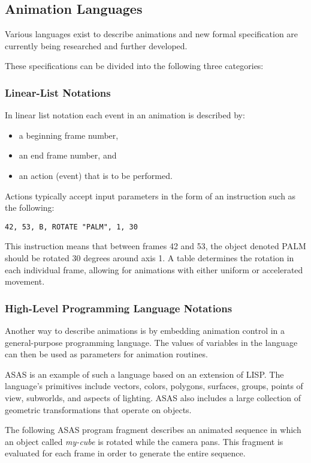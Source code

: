\subsection{Animation Languages}
Various languages exist to describe animations and new formal specification are currently being researched and further developed.

These specifications can be divided into the following three categories:

\subsubsection{Linear-List Notations}
In linear list notation each event in an animation is described by:
\begin{itemize}
	\item a beginning frame number, 
	\item an end frame number, and 
	\item an action (event) that is to be performed.
\end{itemize}

 Actions typically accept input parameters in the form of an instruction such as the following:
\begin{lstlisting}[numbers=none]
42, 53, B, ROTATE "PALM", 1, 30
\end{lstlisting}
This instruction means that between frames 42 and 53, the object denoted PALM should be rotated 30 degrees around axis 1. A table determines the rotation in each individual frame, allowing for animations with either uniform or accelerated movement.


\subsubsection{High-Level Programming Language Notations}
Another way to describe animations is by embedding animation control in a general-purpose programming language. The values of variables in the language can then be used as parameters for animation routines.

ASAS is an example of such a language based on an extension of LISP. The language’s primitives include vectors, colors, polygons, surfaces, groups, points of view, subworlds, and aspects of lighting. ASAS also includes a large collection of geometric transformations that operate on objects. 

The following ASAS program fragment describes an animated sequence in which an object called \textit{my-cube} is rotated while the camera pans. This fragment is evaluated for each frame in order to generate the entire sequence.


